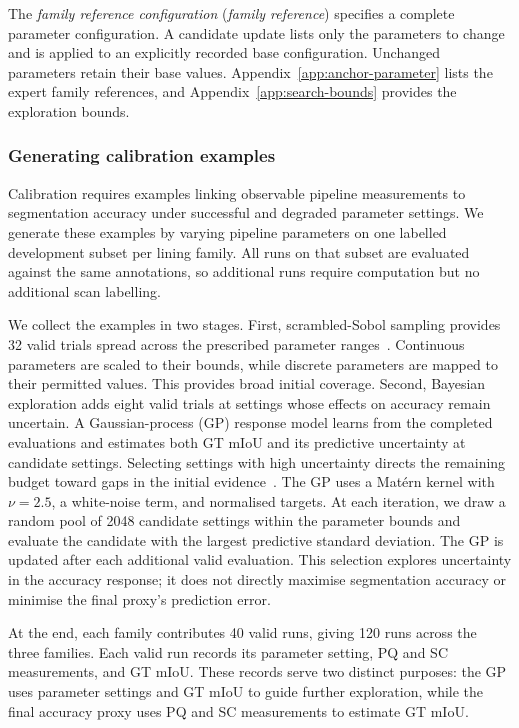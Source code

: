 \documentclass[a4paper,fleqn]{cas-dc}
\begin{document}
{The \emph{family reference configuration} (\emph{family reference}) specifies a complete parameter configuration. A candidate update lists only the parameters to change and is applied to an explicitly recorded base configuration. Unchanged parameters retain their base values. Appendix~\ref{app:anchor-parameter} lists the expert family references, and Appendix~\ref{app:search-bounds} provides the exploration bounds.


\subsubsection{Generating calibration examples}
\label{sec:bo-experience}

Calibration requires examples linking observable pipeline measurements
to segmentation accuracy under successful and degraded parameter
settings. We generate these examples by varying pipeline parameters
on one labelled development subset per lining family. All runs on
that subset are evaluated against the same annotations, so additional
runs require computation but no additional scan labelling.

We collect the examples in two stages. First, scrambled-Sobol sampling
provides 32 valid trials spread across the prescribed parameter
ranges~\cite{joe2008constructing}. Continuous parameters are scaled
to their bounds, while discrete parameters are mapped to their
permitted values. This provides broad initial coverage. Second, Bayesian exploration adds eight valid trials at settings
whose effects on accuracy remain uncertain. A Gaussian-process
(GP) response model learns from the completed evaluations and
estimates both GT mIoU and its predictive uncertainty at candidate
settings. Selecting settings with high uncertainty directs the
remaining budget toward gaps in the initial
evidence~\cite{gramacy2009adaptive,gramacy2020surrogates}. The GP uses a Mat\'ern kernel with $\nu=2.5$, a white-noise term,
and normalised targets. At each iteration, we draw a random pool
of 2048 candidate settings within the parameter bounds and evaluate
the candidate with the largest predictive standard deviation.
The GP is updated after each additional valid evaluation. This
selection explores uncertainty in the accuracy response; it does
not directly maximise segmentation accuracy or minimise the final
proxy's prediction error.

At the end, each family contributes 40 valid runs, giving 120 runs across the
three families. Each
valid run records its parameter setting, PQ and SC measurements,
and GT mIoU. These records serve two distinct purposes: the GP
uses parameter settings and GT mIoU to guide further exploration,
while the final accuracy proxy uses PQ and SC measurements to
estimate GT mIoU.

}
\end{document}
